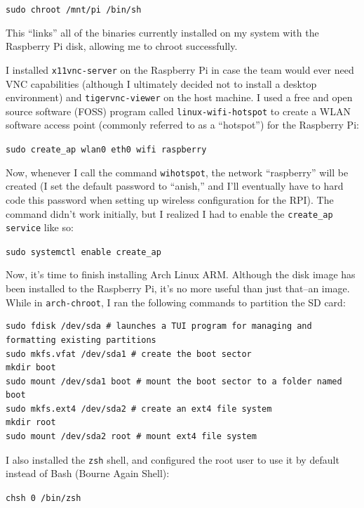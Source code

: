 \Verb"sudo chroot /mnt/pi /bin/sh"

This “links” all of the binaries currently installed on my system with the Raspberry Pi disk, allowing me to chroot successfully.

\newpage


I installed \Verb"x11vnc-server" on the Raspberry Pi in case the team would ever need VNC capabilities (although I ultimately decided not to install a desktop environment) and \Verb"tigervnc-viewer" on the host machine. I used a free and open source software (FOSS) program called \Verb"linux-wifi-hotspot" to create a WLAN software access point (commonly referred to as a “hotspot”) for the Raspberry Pi:

\Verb"sudo create_ap wlan0 eth0 wifi raspberry"

Now, whenever I call the command \Verb"wihotspot", the network “raspberry” will be created (I set the default password to “anish,” and I'll eventually have to hard code this password when setting up wireless configuration for the RPI). The command didn't work initially, but I realized I had to enable the \Verb"create_ap service" like so:

\Verb"sudo systemctl enable create_ap"

\newpage 


Now, it's time to finish installing Arch Linux ARM. Although the disk image has been installed to the Raspberry Pi, it's no more useful than just that--an image. While in \Verb"arch-chroot", I ran the following commands to partition the SD card:

\begin{verbatim}
sudo fdisk /dev/sda # launches a TUI program for managing and formatting existing partitions
sudo mkfs.vfat /dev/sda1 # create the boot sector
mkdir boot
sudo mount /dev/sda1 boot # mount the boot sector to a folder named boot
sudo mkfs.ext4 /dev/sda2 # create an ext4 file system
mkdir root
sudo mount /dev/sda2 root # mount ext4 file system
\end{verbatim}

I also installed the \Verb"zsh" shell, and configured the root user to use it by default instead of Bash (Bourne Again Shell):

\Verb"chsh 0 /bin/zsh"

